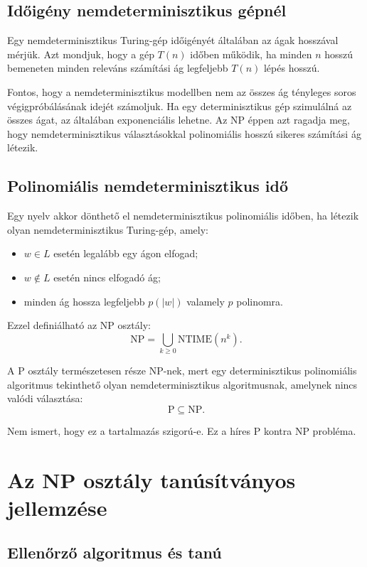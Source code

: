 \subsection{Időigény nemdeterminisztikus gépnél}

Egy nemdeterminisztikus Turing-gép időigényét általában az ágak hosszával mérjük. Azt mondjuk, hogy a gép $T(n)$ időben működik, ha minden $n$ hosszú bemeneten minden releváns számítási ág legfeljebb $T(n)$ lépés hosszú.

Fontos, hogy a nemdeterminisztikus modellben nem az összes ág tényleges soros végigpróbálásának idejét számoljuk. Ha egy determinisztikus gép szimulálná az összes ágat, az általában exponenciális lehetne. Az $\mathrm{NP}$ éppen azt ragadja meg, hogy nemdeterminisztikus választásokkal polinomiális hosszú sikeres számítási ág létezik.

\subsection{Polinomiális nemdeterminisztikus idő}

Egy nyelv akkor dönthető el nemdeterminisztikus polinomiális időben, ha létezik olyan nemdeterminisztikus Turing-gép, amely:

\begin{itemize}
  \item $w\in L$ esetén legalább egy ágon elfogad;
  \item $w\notin L$ esetén nincs elfogadó ág;
  \item minden ág hossza legfeljebb $p(|w|)$ valamely $p$ polinomra.
\end{itemize}

Ezzel definiálható az $\mathrm{NP}$ osztály:
\[
  \mathrm{NP}=\bigcup_{k\geq 0}\mathrm{NTIME}(n^k).
\]

A $\mathrm{P}$ osztály természetesen része $\mathrm{NP}$-nek, mert egy determinisztikus polinomiális algoritmus tekinthető olyan nemdeterminisztikus algoritmusnak, amelynek nincs valódi választása:
\[
  \mathrm{P}\subseteq\mathrm{NP}.
\]

Nem ismert, hogy ez a tartalmazás szigorú-e. Ez a híres $\mathrm{P}$ kontra $\mathrm{NP}$ probléma.

\section{Az NP osztály tanúsítványos jellemzése}

\subsection{Ellenőrző algoritmus és tanú}


